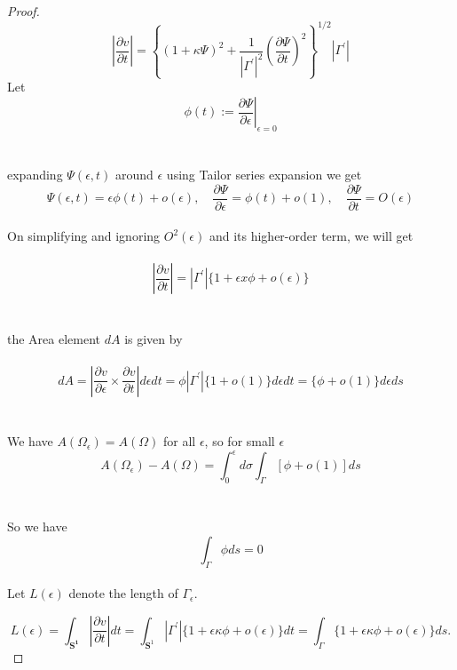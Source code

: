 \documentclass[oneside]{book}
\begin{document}
\begin{proof}
                    $$\left|\frac{\partial v}{\partial t}\right|=\left\{(1+\kappa \Psi)^{2}+\frac{1}{\left|\Gamma^{\prime}\right|^{2}}\left(\frac{\partial \Psi}{\partial t}\right)^{2}\right\}^{1 / 2}\left|\Gamma^{\prime}\right|$$
Let   \\
                     
                      $$\phi(t):=\left.\frac{\partial \Psi}{\partial \epsilon}\right|_{\epsilon=0}$$ \\\\
                      
expanding $\Psi(\epsilon, t)$ around $\epsilon$ using Tailor series expansion we get \\

$$
\Psi(\epsilon, t)=\epsilon \phi(t)+o(\epsilon), \quad \frac{\partial \Psi}{\partial \epsilon}=\phi(t)+o(1), \quad \frac{\partial \Psi}{\partial t}=O(\epsilon)
$$ \\
On simplifying and ignoring $O^2(\epsilon)$ and its higher-order term, we will get \\\\
$$
\left|\frac{\partial v}{\partial t}\right|=\left|\Gamma^{\prime}\right|\{1+\epsilon x \phi+o(\epsilon)\}
$$ 
\\\\
 the Area element $d A$  is given by
 \\\\
     \begin{equation}
     \label{eq13}  
d A=\left|\frac{\partial v}{\partial \epsilon} \times \frac{\partial v}{\partial t}\right| d \epsilon d t=\phi\left|\Gamma^{\prime}\right|\{1+o(1)\} d \epsilon d t=\{\phi+o(1)\} d \epsilon d s
    \end{equation} \\\\
We have $A\left(\Omega_{\epsilon}\right)=A(\Omega)$ for all $\epsilon$, so for small $\epsilon$ \\

 $$
A\left(\Omega_{\epsilon}\right)-A(\Omega)=\int_{0}^{\epsilon} d \sigma \int_{\Gamma}[\phi+o(1)] d s
$$
\\\\
So we have \\
$$  
\int_{\Gamma} \phi d s=0
$$ \\
 Let $L(\epsilon)$ denote the length of $\Gamma_{\epsilon} .$  



$$ L(\epsilon)=\int_{\mathbf{S^1}}\left|\frac{\partial v}{\partial t}\right| d t=\int_{\mathbf{S}^{1}}\left|\Gamma^{\prime}\right|\{1+\epsilon \kappa \phi+o(\epsilon)\} d t=\int_{\Gamma}\{1+\epsilon \kappa \phi+o(\epsilon)\} d s. $$


\end{proof}
\end{document}
